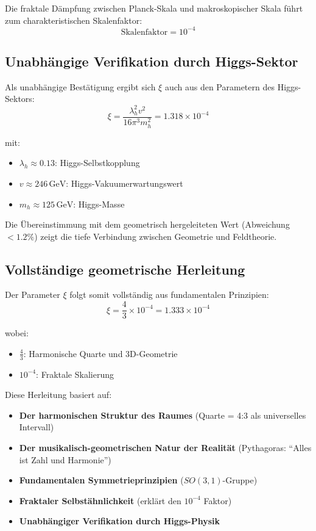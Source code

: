 \documentclass[12pt,a4paper]{article}
\newcommand{\xipar}{\xi}                    %
\newcommand{\GeV}{\,\text{GeV}}             %
\theoremstyle{definition}
\begin{document}
Die fraktale D\"ampfung zwischen Planck-Skala und makroskopischer Skala f\"uhrt zum charakteristischen Skalenfaktor:
\begin{equation}
	\text{Skalenfaktor} = 10^{-4}
\end{equation}

\subsection{Unabh\"angige Verifikation durch Higgs-Sektor}

Als unabh\"angige Best\"atigung ergibt sich $\xipar$ auch aus den Parametern des Higgs-Sektors:
\begin{equation}
	\xipar = \frac{\lambda_h^2 v^2}{16\pi^3 m_h^2} = 1.318 \times 10^{-4}
\end{equation}

mit:
\begin{itemize}
	\item $\lambda_h \approx 0.13$: Higgs-Selbstkopplung
	\item $v \approx 246\GeV$: Higgs-Vakuumerwartungswert
	\item $m_h \approx 125\GeV$: Higgs-Masse
\end{itemize}

Die \"Ubereinstimmung mit dem geometrisch hergeleiteten Wert (Abweichung $< 1.2\%$) zeigt die tiefe Verbindung zwischen Geometrie und Feldtheorie.

\subsection{Vollst\"andige geometrische Herleitung}

Der Parameter $\xipar$ folgt somit vollst\"andig aus fundamentalen Prinzipien:
\begin{equation}
	\xipar = \frac{4}{3} \times 10^{-4} = 1.333 \times 10^{-4}
\end{equation}

wobei:
\begin{itemize}
	\item $\frac{4}{3}$: Harmonische Quarte und 3D-Geometrie
	\item $10^{-4}$: Fraktale Skalierung
\end{itemize}

Diese Herleitung basiert auf:
\begin{itemize}
	\item \textbf{Der harmonischen Struktur des Raumes} (Quarte = 4:3 als universelles Intervall)
	\item \textbf{Der musikalisch-geometrischen Natur der Realit\"at} (Pythagoras: ``Alles ist Zahl und Harmonie'')
	\item \textbf{Fundamentalen Symmetrieprinzipien} ($SO(3,1)$-Gruppe)
	\item \textbf{Fraktaler Selbst\"ahnlichkeit} (erkl\"art den $10^{-4}$ Faktor)
	\item \textbf{Unabh\"angiger Verifikation durch Higgs-Physik}
\end{itemize}
\end{document}
